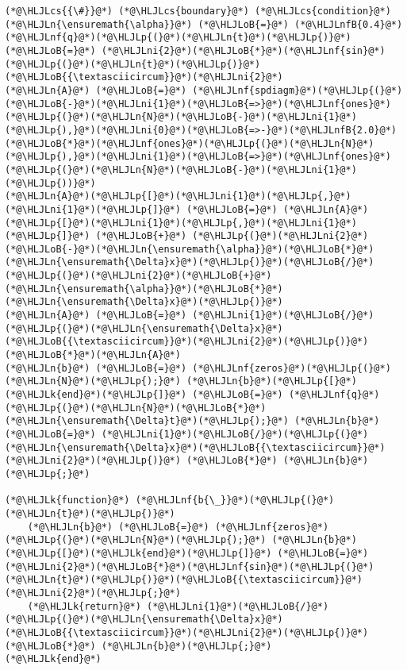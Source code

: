 \documentclass[12pt,a4paper]{article}
\newcommand{\HLJLk}[1]{\textcolor[RGB]{148,91,176}{\textbf{#1}}}
\newcommand{\HLJLn}[1]{#1}
\newcommand{\HLJLnf}[1]{\textcolor[RGB]{66,102,213}{#1}}
\newcommand{\HLJLnfB}[1]{\textcolor[RGB]{59,151,46}{#1}}
\newcommand{\HLJLni}[1]{\textcolor[RGB]{59,151,46}{#1}}
\newcommand{\HLJLoB}[1]{\textcolor[RGB]{102,102,102}{\textbf{#1}}}
\newcommand{\HLJLp}[1]{#1}
\newcommand{\HLJLcs}[1]{\textcolor[RGB]{153,153,119}{\textit{#1}}}
\begin{document}
\begin{lstlisting}
(*@\HLJLcs{{\#}}@*) (*@\HLJLcs{boundary}@*) (*@\HLJLcs{condition}@*)
(*@\HLJLn{\ensuremath{\alpha}}@*) (*@\HLJLoB{=}@*) (*@\HLJLnfB{0.4}@*)
(*@\HLJLnf{q}@*)(*@\HLJLp{(}@*)(*@\HLJLn{t}@*)(*@\HLJLp{)}@*) (*@\HLJLoB{=}@*) (*@\HLJLni{2}@*)(*@\HLJLoB{*}@*)(*@\HLJLnf{sin}@*)(*@\HLJLp{(}@*)(*@\HLJLn{t}@*)(*@\HLJLp{)}@*)(*@\HLJLoB{{\textasciicircum}}@*)(*@\HLJLni{2}@*)
(*@\HLJLn{A}@*) (*@\HLJLoB{=}@*) (*@\HLJLnf{spdiagm}@*)(*@\HLJLp{(}@*)(*@\HLJLoB{-}@*)(*@\HLJLni{1}@*)(*@\HLJLoB{=>}@*)(*@\HLJLnf{ones}@*)(*@\HLJLp{(}@*)(*@\HLJLn{N}@*)(*@\HLJLoB{-}@*)(*@\HLJLni{1}@*)(*@\HLJLp{),}@*)(*@\HLJLni{0}@*)(*@\HLJLoB{=>-}@*)(*@\HLJLnfB{2.0}@*)(*@\HLJLoB{*}@*)(*@\HLJLnf{ones}@*)(*@\HLJLp{(}@*)(*@\HLJLn{N}@*)(*@\HLJLp{),}@*)(*@\HLJLni{1}@*)(*@\HLJLoB{=>}@*)(*@\HLJLnf{ones}@*)(*@\HLJLp{(}@*)(*@\HLJLn{N}@*)(*@\HLJLoB{-}@*)(*@\HLJLni{1}@*)(*@\HLJLp{))}@*)
(*@\HLJLn{A}@*)(*@\HLJLp{[}@*)(*@\HLJLni{1}@*)(*@\HLJLp{,}@*)(*@\HLJLni{1}@*)(*@\HLJLp{]}@*) (*@\HLJLoB{=}@*) (*@\HLJLn{A}@*)(*@\HLJLp{[}@*)(*@\HLJLni{1}@*)(*@\HLJLp{,}@*)(*@\HLJLni{1}@*)(*@\HLJLp{]}@*) (*@\HLJLoB{+}@*) (*@\HLJLp{(}@*)(*@\HLJLni{2}@*)(*@\HLJLoB{-}@*)(*@\HLJLn{\ensuremath{\alpha}}@*)(*@\HLJLoB{*}@*)(*@\HLJLn{\ensuremath{\Delta}x}@*)(*@\HLJLp{)}@*)(*@\HLJLoB{/}@*)(*@\HLJLp{(}@*)(*@\HLJLni{2}@*)(*@\HLJLoB{+}@*)(*@\HLJLn{\ensuremath{\alpha}}@*)(*@\HLJLoB{*}@*)(*@\HLJLn{\ensuremath{\Delta}x}@*)(*@\HLJLp{)}@*)
(*@\HLJLn{A}@*) (*@\HLJLoB{=}@*) (*@\HLJLni{1}@*)(*@\HLJLoB{/}@*)(*@\HLJLp{(}@*)(*@\HLJLn{\ensuremath{\Delta}x}@*)(*@\HLJLoB{{\textasciicircum}}@*)(*@\HLJLni{2}@*)(*@\HLJLp{)}@*)(*@\HLJLoB{*}@*)(*@\HLJLn{A}@*)
(*@\HLJLn{b}@*) (*@\HLJLoB{=}@*) (*@\HLJLnf{zeros}@*)(*@\HLJLp{(}@*)(*@\HLJLn{N}@*)(*@\HLJLp{);}@*) (*@\HLJLn{b}@*)(*@\HLJLp{[}@*)(*@\HLJLk{end}@*)(*@\HLJLp{]}@*) (*@\HLJLoB{=}@*) (*@\HLJLnf{q}@*)(*@\HLJLp{(}@*)(*@\HLJLn{N}@*)(*@\HLJLoB{*}@*)(*@\HLJLn{\ensuremath{\Delta}t}@*)(*@\HLJLp{);}@*) (*@\HLJLn{b}@*) (*@\HLJLoB{=}@*) (*@\HLJLni{1}@*)(*@\HLJLoB{/}@*)(*@\HLJLp{(}@*)(*@\HLJLn{\ensuremath{\Delta}x}@*)(*@\HLJLoB{{\textasciicircum}}@*)(*@\HLJLni{2}@*)(*@\HLJLp{)}@*) (*@\HLJLoB{*}@*) (*@\HLJLn{b}@*)(*@\HLJLp{;}@*)

(*@\HLJLk{function}@*) (*@\HLJLnf{b{\_}}@*)(*@\HLJLp{(}@*)(*@\HLJLn{t}@*)(*@\HLJLp{)}@*)
    (*@\HLJLn{b}@*) (*@\HLJLoB{=}@*) (*@\HLJLnf{zeros}@*)(*@\HLJLp{(}@*)(*@\HLJLn{N}@*)(*@\HLJLp{);}@*) (*@\HLJLn{b}@*)(*@\HLJLp{[}@*)(*@\HLJLk{end}@*)(*@\HLJLp{]}@*) (*@\HLJLoB{=}@*) (*@\HLJLni{2}@*)(*@\HLJLoB{*}@*)(*@\HLJLnf{sin}@*)(*@\HLJLp{(}@*)(*@\HLJLn{t}@*)(*@\HLJLp{)}@*)(*@\HLJLoB{{\textasciicircum}}@*)(*@\HLJLni{2}@*)(*@\HLJLp{;}@*)
    (*@\HLJLk{return}@*) (*@\HLJLni{1}@*)(*@\HLJLoB{/}@*)(*@\HLJLp{(}@*)(*@\HLJLn{\ensuremath{\Delta}x}@*)(*@\HLJLoB{{\textasciicircum}}@*)(*@\HLJLni{2}@*)(*@\HLJLp{)}@*) (*@\HLJLoB{*}@*) (*@\HLJLn{b}@*)(*@\HLJLp{;}@*)
(*@\HLJLk{end}@*)


\end{lstlisting}
\end{document}
